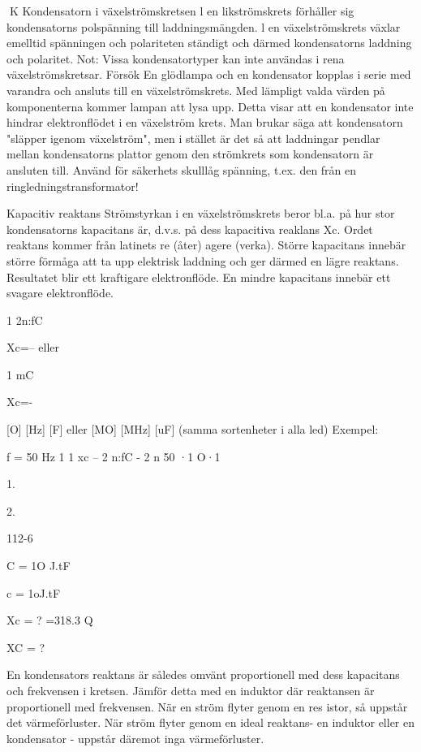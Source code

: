 \documentclass[a4paper,twoside,twocolumn,openright]{book}
\begin{document}
{{K
Kondensatorn i växelströmskretsen
l en likströmskrets förhåller sig kondensatorns polspänning till laddningsmängden. l
en växelströmskrets växlar emelltid spänningen och polariteten ständigt och därmed
kondensatorns laddning och polaritet.
Not: Vissa kondensatortyper kan inte användas i rena växelströmskretsar.
Försök
En glödlampa och en kondensator kopplas i
serie med varandra och ansluts till en
växelströmskrets. Med lämpligt valda värden på komponenterna kommer lampan att
lysa upp.
Detta visar att en kondensator inte hindrar elektronflödet i en växelström krets. Man
brukar säga att kondensatorn "släpper igenom växelström", men i stället är det så att
laddningar pendlar mellan kondensatorns
plattor genom den strömkrets som kondensatorn är ansluten till.
Använd för säkerhets skulllåg spänning,
t.ex. den från en ringledningstransformator!

Kapacitiv reaktans
Strömstyrkan i en växelströmskrets beror
bl.a. på hur stor kondensatorns kapacitans
är, d.v.s. på dess kapacitiva reaklans Xc.
Ordet reaktans kommer från latinets re
(åter) agere (verka).
Större kapacitans innebär större förmåga att ta upp elektrisk laddning och ger
därmed en lägre reaktans. Resultatet blir ett
kraftigare elektronflöde. En mindre kapacitans innebär ett svagare elektronflöde.

1
2n:fC

Xc=-- eller

1
mC

Xc=-

[O]
[Hz]
[F]
eller
[MO]
[MHz]
[uF]
(samma sortenheter i alla led)
Exempel:

f = 50 Hz
1
1
xc -- 2 n:fC - 2 n 50 ·1 O·1

1.

2.

112-6

C = 1O J.tF

c = 1oJ.tF

Xc = ?
=318.3 Q

XC = ?

En kondensators reaktans är således
omvänt proportionell med dess kapacitans
och frekvensen i kretsen.
Jämför detta med en induktor där reaktansen är proportionell med frekvensen.
När en ström flyter genom en res istor, så
uppstår det värmeförluster. När ström flyter
genom en ideal reaktans- en induktor eller
en kondensator - uppstår däremot inga
värmeförluster.

}}
\end{document}
